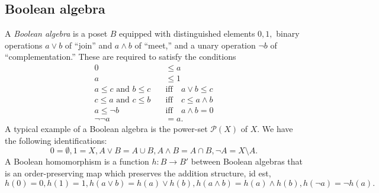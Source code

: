 \subsection{Boolean algebra} \label{boolalg}
A \emph{Boolean algebra} is a poset $B$ equipped with distinguished elements $0, 1,$ binary operations $a\vee b$ of ``join'' and $a\wedge b$ of ``meet,'' and a unary operation $\neg b$ of ``complementation.'' These are required to satisfy the conditions
\begin{align*} 
	0 &\le a\\
	a &\le 1\\
	a \le c \text{ and } b \le c \quad &\text{iff} \quad a \vee b \le c \\
	c \le a \text{ and } c \le b \quad &\text{iff} \quad c \le a \wedge b \\
	a \le \neg b \quad &\text{iff} \quad a \wedge b = 0\\
	\neg\neg a  &= a.
\end{align*}
A typical example of a Boolean algebra is the power-set $\mathcal{P}(X)$ of $X.$ We have the following identifications:
\begin{equation*} 
	0 = \emptyset, 1 = X, A \vee B = A \cup B, A \wedge B = A \cap B, \neg A = X\setminus A.
\end{equation*}
A Boolean homomorphism is a function $h:B\to B'$ between Boolean algebras that is an order-preserving map which preserves the addition structure, id est, $h(0) = 0, h(1) = 1, h(a \vee b) = h(a) \vee h(b), h(a \wedge b) = h(a) \wedge h(b), h(\neg a) = \neg h(a).$